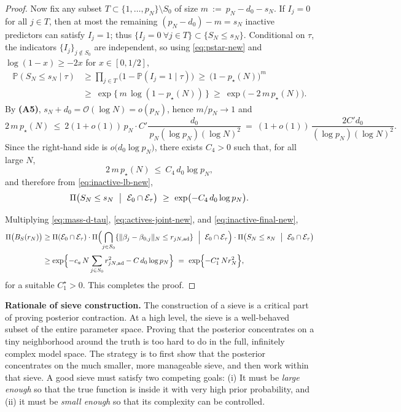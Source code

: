 \documentclass[11pt]{article}
\theoremstyle{plain}
\theoremstyle{definition}
\theoremstyle{plain}
\begin{document}
\begin{proof}
Now fix any subset $T\subset \{1,\dots,p_N\}\setminus S_0$ of size
\(
m\ :=\ p_N - d_0 - s_N.
\)
If $I_j=0$ for all $j\in T$, then at most the remaining $(p_N-d_0)-m=s_N$ inactive predictors can satisfy $I_j=1$; thus
\(
\{I_j=0\ \forall j\in T\}\subset\{S_N\le s_N\}.
\)
Conditional on $\tau$, the indicators $\{I_j\}_{j\notin S_0}$ are independent, so using \eqref{eq:pstar-new} and $\log(1-x)\ge-2x$ for $x\in[0,1/2]$,
\begin{align}
\mathbb P(S_N\le s_N\mid \tau)
&\ge \prod_{j\in T}\bigl(1-\mathbb P(I_j=1\mid \tau)\bigr)
\ \ge\ \bigl(1-p_\star(N)\bigr)^{m}\nonumber\\
&\ge\ \exp\bigl\{\,m\,\log(1-p_\star(N))\,\bigr\}
\ \ge\ \exp\bigl(-2\,m\,p_\star(N)\bigr).\label{eq:inactive-lb-new}
\end{align}
By {\textbf{(A5)}}, $s_N+d_0=\mathcal O(\log N)=o(p_N)$, hence $m/p_N\to 1$ and
\[
2\,m\,p_\star(N)\ \le\ 2(1+o(1))\,p_N\cdot C'\frac{d_0}{\,p_N(\log p_N)(\log N)^2}
\ =\ (1+o(1))\,\frac{2C' d_0}{(\log p_N)(\log N)^2}.
\]
Since the right-hand side is $o \big(d_0\log p_N\big)$, there exists $C_4>0$ such that, for all large $N$,
\[
2\,m\,p_\star(N)\ \le\ C_4\,d_0\log p_N,
\]
and therefore from \eqref{eq:inactive-lb-new},
\begin{equation}\label{eq:inactive-final-new}
\Pi\bigl(S_N\le s_N\ \bigm|\ \mathcal E_0\cap\mathcal E_\tau\bigr)
\ \ge\ \exp \bigl(-C_4\,d_0\log p_N\bigr).
\end{equation}

\medskip\noindent
Multiplying \eqref{eq:mass-d-tau}, \eqref{eq:actives-joint-new}, and \eqref{eq:inactive-final-new},
\begin{align*}
\Pi\bigl(B_S(r_N)\bigr)
&\ge \Pi(\mathcal E_0\cap\mathcal E_\tau)\cdot 
\Pi\Bigl(\bigcap_{j\in S_0}\{\|\beta_j-\beta_{0,j}\|_N\le r_{jN,\mathrm{ad}}\}\ \Bigm| \ \mathcal E_0\cap\mathcal E_\tau\Bigr)
\cdot
\Pi\bigl(S_N\le s_N\ \bigm|\ \mathcal E_0\cap\mathcal E_\tau\bigr)\\[2pt]
&\ge \exp \Bigl\{-c_a\,N\sum_{j\in S_0} r_{jN,\mathrm{ad}}^2 - C\,d_0\log p_N\Bigr\}
\ =\ \exp \Bigl\{-C_1^\star\,N r_N^2\Bigr\},
\end{align*}
for a suitable $C_1^\star>0$. This completes the proof.
\end{proof}

\textbf{Rationale of sieve construction.} The construction of a sieve is a critical part of proving posterior contraction. At a high level, the sieve is a well-behaved subset of the entire parameter space. Proving that the posterior concentrates on a tiny neighborhood around the truth is too hard to do in the full, infinitely complex model space. The strategy is to first show that the posterior concentrates on the much smaller, more manageable sieve, and then work within that sieve. A good sieve must satisfy two competing goals: (i) It must be \emph{large enough} so that the true function is inside it with very high prior probability, and (ii) it must be \emph{small enough} so that its complexity can be controlled.
\end{document}
